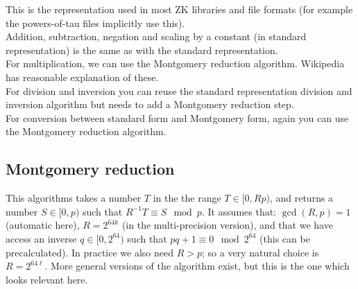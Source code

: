 \documentclass[12pt,draft,a4paper,openany,oneside]{amsbook}
\theoremstyle{plain}
\theoremstyle{definition}
\begin{document}
This is the representation used in most ZK libraries and file formats (for example
the powers-of-tau files implicitly use this).\\

Addition, subtraction, negation and scaling by a constant (in standard representation) 
is the same as with the standard representation.\\

For multiplication, we can use the Montgomery reduction algorithm. Wikipedia
has reasonable explanation of these.\\

For division and inversion you can reuse the standard representation division and inversion
algorithm but needs to add a Montgomery reduction step.\\

For conversion between standard form and Montgomery form, again you can use
the Montgomery reduction algorithm.\\

\subsection{Montgomery reduction}
This algorithms takes a number $T$ in the the range $T\in[0,Rp)$, and returns
a number $S\in[0,p)$ such that $R^{-1}T\equiv S \mod p$. It assumes that:
$\gcd(R,p)=1$ (automatic here), $R=2^{64k}$ (in the multi-precision version), and that we have access
an inverse $q\in[0,2^{64})$ such that $pq + 1 \equiv 0\mod 2^{64}$ (this can be precalculated).
In practice we also need $R>p$; so a very natural choice is $R=2^{64\ell}$.
More general versions of the algorithm exist, but this is the one which looks
relevant here.


\end{document}
